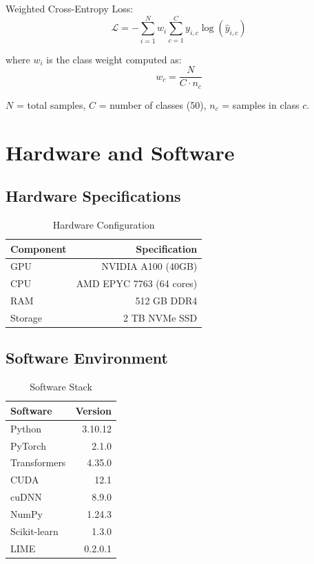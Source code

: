 \documentclass[10pt,a4paper]{article}
\begin{document}
Weighted Cross-Entropy Loss:
\begin{equation}
\mathcal{L} = -\sum_{i=1}^{N} w_i \sum_{c=1}^{C} y_{i,c} \log(\hat{y}_{i,c})
\end{equation}

where $w_i$ is the class weight computed as:
\begin{equation}
w_c = \frac{N}{C \cdot n_c}
\end{equation}

$N$ = total samples, $C$ = number of classes (50), $n_c$ = samples in class $c$.

\section{Hardware and Software}

\subsection{Hardware Specifications}

\begin{table}[h]
\centering
\caption{Hardware Configuration}
\begin{tabular}{lr}
\toprule
\rowcolor{headerblue}
\textbf{Component} & \textbf{Specification} \\
\midrule
GPU                 & NVIDIA A100 (40GB) \\
CPU                 & AMD EPYC 7763 (64 cores) \\
RAM                 & 512 GB DDR4 \\
Storage             & 2 TB NVMe SSD \\
\bottomrule
\end{tabular}
\end{table}

\subsection{Software Environment}

\begin{table}[h]
\centering
\caption{Software Stack}
\begin{tabular}{lr}
\toprule
\rowcolor{headerblue}
\textbf{Software} & \textbf{Version} \\
\midrule
Python              & 3.10.12 \\
PyTorch             & 2.1.0 \\
Transformers        & 4.35.0 \\
CUDA                & 12.1 \\
cuDNN               & 8.9.0 \\
NumPy               & 1.24.3 \\
Scikit-learn        & 1.3.0 \\
LIME                & 0.2.0.1 \\
\bottomrule
\end{tabular}
\end{table}
\end{document}
